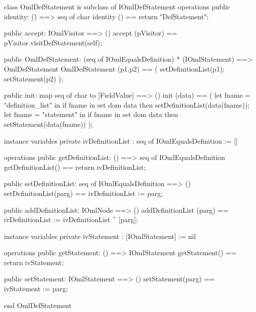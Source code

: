 \begin{vdm_al}
class OmlDefStatement is subclass of IOmlDefStatement
operations
  public identity: () ==> seq of char
  identity () == return "DefStatement";

  public accept: IOmlVisitor ==> ()
  accept (pVisitor) == pVisitor.visitDefStatement(self);

  public OmlDefStatement:
      (seq of IOmlEqualsDefinition) *
      (IOmlStatement) ==> OmlDefStatement
  OmlDefStatement (p1,p2) == 
   ( setDefinitionList(p1);
     setStatement(p2) );

  public init: map seq of char to [FieldValue] ==> ()
  init (data) ==
    ( let fname = "definition_list" in
        if fname in set dom data
        then setDefinitionList(data(fname));
      let fname = "statement" in
        if fname in set dom data
        then setStatement(data(fname)) );

instance variables
  private ivDefinitionList : seq of IOmlEqualsDefinition := []

operations
  public getDefinitionList: () ==> seq of IOmlEqualsDefinition
  getDefinitionList() == return ivDefinitionList;

  public setDefinitionList: seq of IOmlEqualsDefinition ==> ()
  setDefinitionList(parg) == ivDefinitionList := parg;

  public addDefinitionList: IOmlNode ==> ()
  addDefinitionList (parg) == ivDefinitionList := ivDefinitionList ^ [parg];

instance variables
  private ivStatement : [IOmlStatement] := nil

operations
  public getStatement: () ==> IOmlStatement
  getStatement() == return ivStatement;

  public setStatement: IOmlStatement ==> ()
  setStatement(parg) == ivStatement := parg;

end OmlDefStatement
\end{vdm_al}


